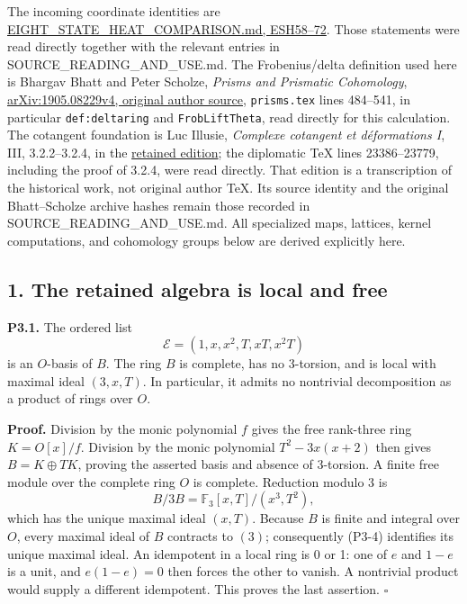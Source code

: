 \documentclass[
]{article}
\begin{document}
The incoming coordinate identities are
\href{https://github.com/KokunoYumeto/zeta-function-research-reader/blob/d5c9d198a8432e3ede468b280162a99c00e3f4f7/workbenches/splitzero-tandem/branches/tau-zero-prime-positivity/EIGHT_STATE_HEAT_COMPARISON.md}{EIGHT\_STATE\_HEAT\_COMPARISON.md,
ESH58--72}. Those statements were read directly together with the
relevant entries in SOURCE\_READING\_AND\_USE.md. The Frobenius/delta
definition used here is Bhargav Bhatt and Peter Scholze, \emph{Prisms
and Prismatic Cohomology},
\href{https://arxiv.org/src/1905.08229v4}{arXiv:1905.08229v4, original
author source}, \texttt{prisms.tex} lines 484--541, in particular
\texttt{def:deltaring} and \texttt{FrobLiftTheta}, read directly for
this calculation. The cotangent foundation is Luc Illusie,
\emph{Complexe cotangent et déformations I}, III, 3.2.2--3.2.4, in the
\href{https://zenodo.org/records/22884471}{retained edition}; the
diplomatic TeX lines 23386--23779, including the proof of 3.2.4, were
read directly. That edition is a transcription of the historical work,
not original author TeX. Its source identity and the original
Bhatt--Scholze archive hashes remain those recorded in
SOURCE\_READING\_AND\_USE.md. All specialized maps, lattices, kernel
computations, and cohomology groups below are derived explicitly here.

\subsection{1. The retained algebra is local and
free}\label{the-retained-algebra-is-local-and-free}

\textbf{P3.1.} The ordered list \[
\mathcal E=(1,x,x^2,T,xT,x^2T)
\tag{P3-3}
\] is an \(O\)-basis of \(B\). The ring \(B\) is complete, has no
3-torsion, and is local with maximal ideal \((3,x,T)\). In particular,
it admits no nontrivial decomposition as a product of rings over \(O\).

\textbf{Proof.} Division by the monic polynomial \(f\) gives the free
rank-three ring \(K=O[x]/f\). Division by the monic polynomial
\(T^2-3x(x+2)\) then gives \(B=K\oplus TK\), proving the asserted basis
and absence of 3-torsion. A finite free module over the complete ring
\(O\) is complete. Reduction modulo 3 is \[
B/3B=\mathbb F_3[x,T]/(x^3,T^2),
\tag{P3-4}
\] which has the unique maximal ideal \((x,T)\). Because \(B\) is finite
and integral over \(O\), every maximal ideal of \(B\) contracts to
\((3)\); consequently (P3-4) identifies its unique maximal ideal. An
idempotent in a local ring is 0 or 1: one of \(e\) and \(1-e\) is a
unit, and \(e(1-e)=0\) then forces the other to vanish. A nontrivial
product would supply a different idempotent. This proves the last
assertion. \(\square\)
\end{document}
